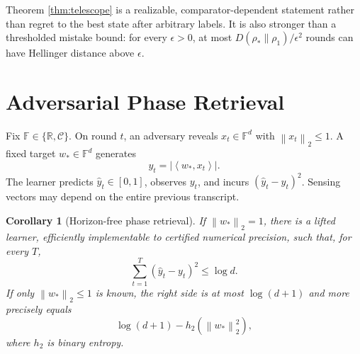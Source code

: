 \documentclass[twoside]{article}
\newtheorem{corollary}[theorem]{Corollary}
\newcommand{\C}{\mathcal C}
\newcommand{\R}{\mathbb R}
\newcommand{\ip}[2]{\left\langle #1,#2\right\rangle}
\newcommand{\norm}[1]{\left\lVert #1\right\rVert}
\begin{document}
Theorem \ref{thm:telescope} is a realizable, comparator-dependent statement rather than regret to the best state after arbitrary labels. It is also stronger than a thresholded mistake bound: for every $\epsilon>0$, at most $D(\rho_*\|\rho_1)/\epsilon^2$ rounds can have Hellinger distance above $\epsilon$.

\section{Adversarial Phase Retrieval}
\label{sec:phase}

Fix $\mathbb F\in\{\R,\C\}$. On round $t$, an adversary reveals $x_t\in\mathbb F^d$ with $\norm{x_t}_2\leq1$. A fixed target $w_*\in\mathbb F^d$ generates
\begin{equation}
y_t=|\ip{w_*}{x_t}|.
\end{equation}
The learner predicts $\widehat y_t\in[0,1]$, observes $y_t$, and incurs $(\widehat y_t-y_t)^2$. Sensing vectors may depend on the entire previous transcript.

\begin{corollary}[Horizon-free phase retrieval]
\label{cor:phase-upper}
If $\norm{w_*}_2=1$, there is a lifted learner, efficiently implementable to certified numerical precision, such that, for every $T$,
\begin{equation}
\sum_{t=1}^T(\widehat y_t-y_t)^2\leq\log d.
\label{eq:phase-logd}
\end{equation}
If only $\norm{w_*}_2\leq1$ is known, the right side is at most $\log(d+1)$ and more precisely equals
\begin{equation}
\log(d+1)-h_2(\norm{w_*}_2^2),
\label{eq:norm-adaptive}
\end{equation}
where $h_2$ is binary entropy.
\end{corollary}
\end{document}
